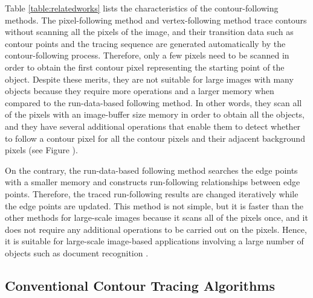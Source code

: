Table \ref{table:relatedworks} lists the characteristics of the contour-following methods. The pixel-following method and vertex-following method trace contours without scanning all the pixels of the image, and their transition data such as contour points and the tracing sequence are generated automatically by the contour-following process. Therefore, only a few pixels need to be scanned in order to obtain the first contour pixel representing the starting point of the object. Despite these merits, they are not suitable for large images with many objects because they require more operations and a larger memory when compared to the run-data-based following method. In other words, they scan all of the pixels with an image-buffer size memory in order to obtain all the objects, and they have several additional operations that enable them to detect whether to follow a contour pixel for all the contour pixels and their adjacent background pixels (see Figure ). 


On the contrary, the run-data-based following method searches the edge points with a smaller memory and constructs run-following relationships between edge points. Therefore, the traced run-following results are changed iteratively while the edge points are updated. This method is not simple, but it is faster than the other methods for large-scale images because it scans all of the pixels once, and it does not require any additional operations to be carried out on the pixels. Hence, it is suitable for large-scale image-based applications involving a large number of objects such as document recognition \cite{Miyatake1997Contour}.


\subsection{Conventional Contour Tracing Algorithms}

